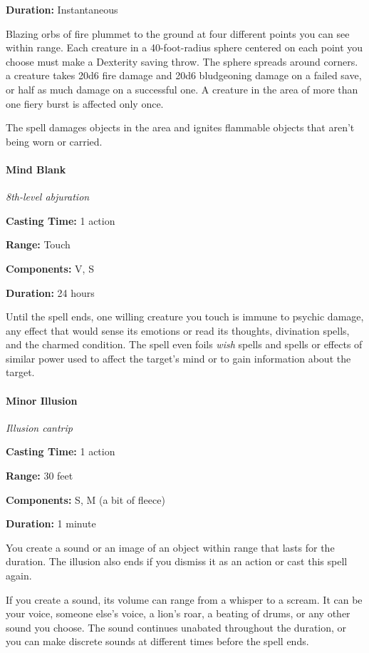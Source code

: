 \documentclass[
]{article}
\begin{document}
\textbf{Duration:} Instantaneous

Blazing orbs of fire plummet to the ground at four different points you
can see within range. Each creature in a 40-foot-radius sphere centered
on each point you choose must make a Dexterity saving throw. The sphere
spreads around corners. a creature takes 20d6 fire damage and 20d6
bludgeoning damage on a failed save, or half as much damage on a
successful one. A creature in the area of more than one fiery burst is
affected only once.

The spell damages objects in the area and ignites flammable objects that
aren't being worn or carried.

\hypertarget{mind-blank}{%
\paragraph{Mind Blank}\label{mind-blank}}

\emph{8th-level abjuration}

\textbf{Casting Time:} 1 action

\textbf{Range:} Touch

\textbf{Components:} V, S

\textbf{Duration:} 24 hours

Until the spell ends, one willing creature you touch is immune to
psychic damage, any effect that would sense its emotions or read its
thoughts, divination spells, and the charmed condition. The spell even
foils \emph{wish} spells and spells or effects of similar power used to
affect the target's mind or to gain information about the target.

\hypertarget{minor-illusion}{%
\paragraph{Minor Illusion}\label{minor-illusion}}

\emph{Illusion cantrip}

\textbf{Casting Time:} 1 action

\textbf{Range:} 30 feet

\textbf{Components:} S, M (a bit of fleece)

\textbf{Duration:} 1 minute

You create a sound or an image of an object within range that lasts for
the duration. The illusion also ends if you dismiss it as an action or
cast this spell again.

If you create a sound, its volume can range from a whisper to a scream.
It can be your voice, someone else's voice, a lion's roar, a beating of
drums, or any other sound you choose. The sound continues unabated
throughout the duration, or you can make discrete sounds at different
times before the spell ends.
\end{document}
